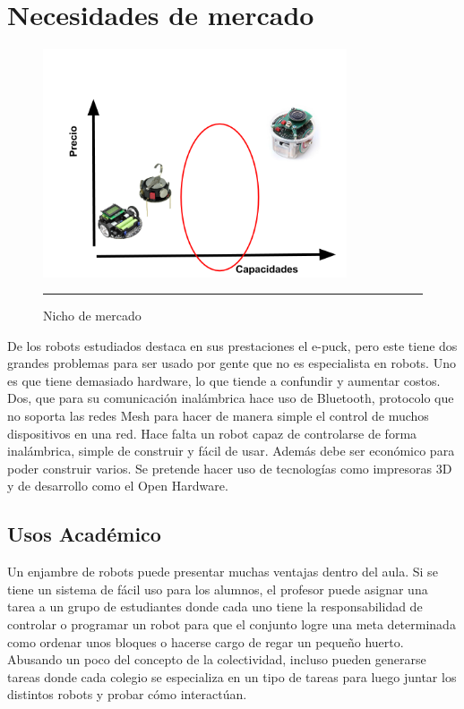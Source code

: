 
\section{Necesidades de mercado}
\begin{figure}[htbp]
	\centering
		\includegraphics[width=0.8\textwidth]{./Figures/nicho.png}
		\rule{35em}{0.5pt}
	\caption[nicho]{Nicho de mercado}
	\label{fig:nicho}
\end{figure}

De los robots estudiados destaca en sus prestaciones el e-puck, pero este tiene dos grandes problemas para ser usado por gente que no es especialista en robots. Uno es que tiene demasiado hardware, lo que tiende a confundir y aumentar costos. Dos, que para su comunicación inalámbrica hace uso de Bluetooth, protocolo que no soporta las redes Mesh para hacer de manera simple el control de muchos dispositivos en una red. Hace falta un robot capaz de controlarse de forma inalámbrica, simple de construir y fácil de usar. Además debe ser económico para poder construir varios. Se pretende hacer uso de tecnologías como impresoras 3D y  de desarrollo como el Open Hardware.



\subsection{Usos Académico}

Un enjambre de robots puede presentar muchas ventajas dentro del aula. Si se tiene un sistema de fácil uso para los alumnos, el profesor puede asignar una tarea a un grupo de estudiantes donde cada uno tiene la responsabilidad de controlar o programar un robot para que el conjunto logre una meta determinada como ordenar unos bloques o hacerse cargo de regar un pequeño huerto. Abusando un poco del concepto de la colectividad, incluso pueden generarse tareas donde cada colegio se especializa en un tipo de tareas para luego juntar los distintos robots y probar cómo interactúan.

